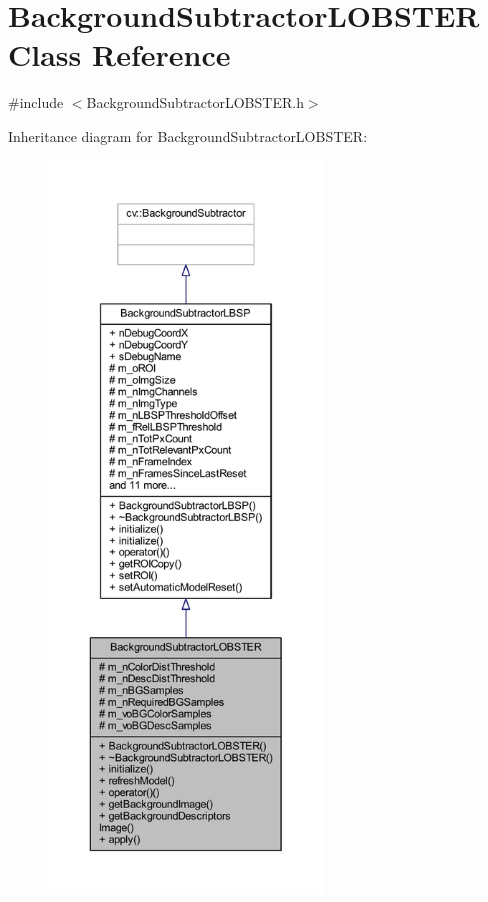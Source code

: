 \hypertarget{class_background_subtractor_l_o_b_s_t_e_r}{}\section{Background\+Subtractor\+L\+O\+B\+S\+T\+ER Class Reference}
\label{class_background_subtractor_l_o_b_s_t_e_r}


{\ttfamily \#include $<$Background\+Subtractor\+L\+O\+B\+S\+T\+E\+R.\+h$>$}



Inheritance diagram for Background\+Subtractor\+L\+O\+B\+S\+T\+ER\+:\nopagebreak
\begin{figure}[H]
\begin{center}
\leavevmode
\includegraphics[height=550pt]{class_background_subtractor_l_o_b_s_t_e_r__inherit__graph}
\end{center}
\end{figure}


